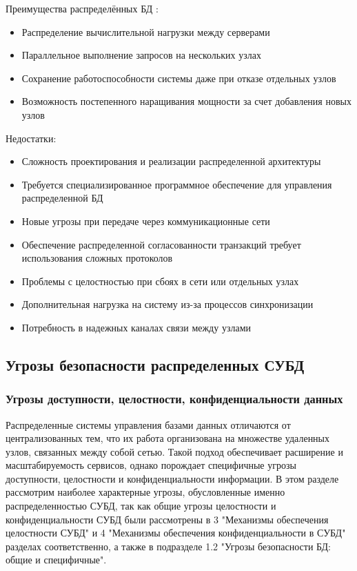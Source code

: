 Преимущества распределённых БД \autocite{DDBMSIndusEdition}:

\begin{itemize}
    \item Распределение вычислительной нагрузки между серверами
    \item Параллельное выполнение запросов на нескольких узлах
    \item Сохранение работоспособности системы даже при отказе отдельных узлов
    \item Возможность постепенного наращивания мощности за счет добавления новых узлов  
\end{itemize}

Недостатки:

\begin{itemize}
        \item Сложность проектирования и реализации распределенной архитектуры
        \item Требуется специализированное программное обеспечение для управления распределенной БД
        \item Новые угрозы при передаче через коммуникационные сети
        \item Обеспечение распределенной согласованности транзакций требует использования сложных протоколов
        \item Проблемы с целостностью при сбоях в сети или отдельных узлах
        \item Дополнительная нагрузка на систему из-за процессов синхронизации
        \item Потребность в надежных каналах связи между узлами
\end{itemize}

\subsection{Угрозы безопасности распределенных СУБД}

\subsubsection{Угрозы доступности, целостности, конфиденциальности данных}
Распределенные системы управления базами данных отличаются от централизованных тем, что их работа организована на множестве удаленных узлов, 
связанных между собой сетью. Такой подход обеспечивает расширение и масштабируемость сервисов, однако порождает специфичные угрозы доступности, 
целостности и конфиденциальности информации. В этом разделе рассмотрим наиболее характерные угрозы, обусловленные именно распределенностью СУБД, 
так как общие угрозы целостности и конфиденциальности СУБД были рассмотрены в 3 "Механизмы обеспечения целостности СУБД" и 4 "Механизмы обеспечения конфиденциальности в СУБД"  разделах соответственно, а также в подразделе 1.2 "Угрозы безопасности БД: общие и специфичные".

